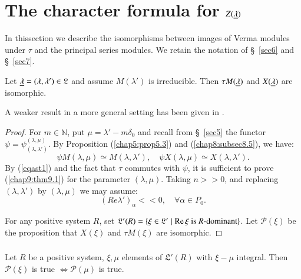 
\chapter{The character formula for $Z(\protect\underline{\lambda})$}\label{sec9}

In this\pageoriginale section we describe the isomorphisms between
images of Verma modules under $\tau$ and the principal series
modules. We retain the notation of \S\ \ref{sec6} and \S\ \ref{sec7}. 


\begin{theorem}\label{chap9:thm9.1}
Let $\underline{\lambda} = (\lambda, \lambda') \in \mathfrak{L}$ and assume
$M(\lambda')$ is irreducible. Then $\tau M(\underline{\lambda})$ and
$X(\underline{\lambda})$ are isomorphic. 
\end{theorem}

A weaker result in a more general setting has been given in
\cite{key14}.

\begin{proof}
For $m \in \mathbb{N}$, put $\mu = \lambda' - m \delta_0$ and recall
from \S\ \ref{sec5} the functor $\psi = \psi^{(\lambda, \mu)}_{(\lambda,
 \lambda')}$. By Proposition (\ref{chap5:prop5.3}) and
(\ref{chap8:subsec8.5}), we have: 
\begin{equation*}
\psi M(\lambda, \mu) \simeq M(\lambda, \lambda'), \quad \psi
X(\lambda, \mu) \simeq X (\lambda, \lambda').\tag{$\ast$}\label{eqast1}
\end{equation*}
By (\ref{eqast1}) and the fact that $\tau$ commutes with $\psi$, it is
sufficient to prove (\ref{chap9:thm9.1}) for the parameter $(\lambda, \mu)$. Taking
$n>> 0$, and replacing  $(\lambda,\lambda')$ by $(\lambda, \mu)$ we
may assume:
\begin{equation*}
(Re \lambda')_\alpha << 0, \quad \forall \alpha \in P_0.
\tag{$\dagger$}
\end{equation*}

For any positive system $R$, set $\mathfrak{L}'(R) = \{\xi \in
\mathfrak{L'} \mid \operatorname{Re} \xi\text{ is $R$-dominant}\}$. Let
$\mathscr{P}(\xi)$ be the proposition that $X(\xi)$ and $\tau M(\xi)$
are isomorphic. 
\end{proof} 

\setcounter{section}{9}
\setcounter{subsection}{1}
\subsection{}\label{chap9:subsec9.2}
Let $R$ be a positive system, $\xi,\mu$ elements of $\mathfrak{L}'(R)$
with $\xi - \mu$ integral. Then $\mathscr{P}(\xi)$ is true
$\Leftrightarrow \mathscr{P}(\mu)$ is true. 


